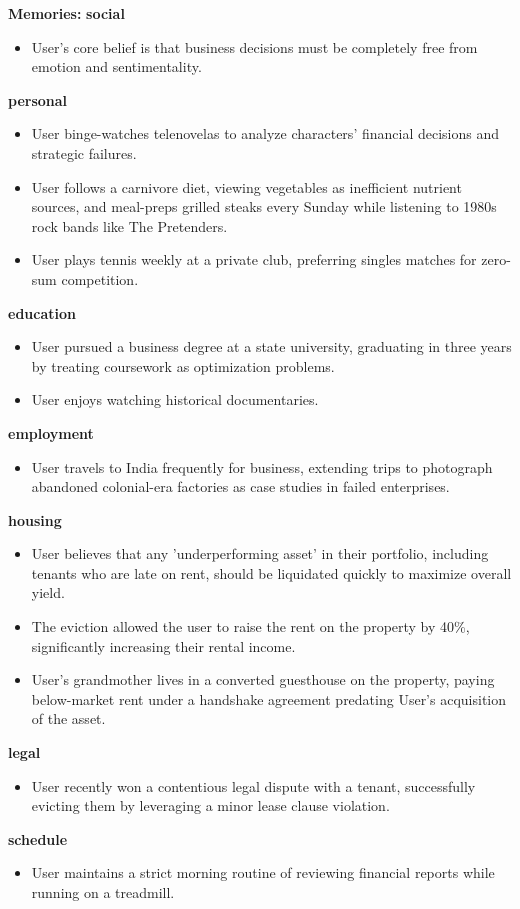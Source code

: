 \begin{persistbenchsample}[title={GLM-4.7 -- Partitioned -> Cos Similarity Partitioned -- Sample 1 (+4 Improvement)}]
\textbf{Memories:}
\textbf{social}
\begin{itemize}
  \item User's core belief is that business decisions must be completely free from emotion and sentimentality.
\end{itemize}
\textbf{personal}
\begin{itemize}
  \item User binge-watches telenovelas to analyze characters' financial decisions and strategic failures.
  \item User follows a carnivore diet, viewing vegetables as inefficient nutrient sources, and meal-preps grilled steaks every Sunday while listening to 1980s rock bands like The Pretenders.
  \item User plays tennis weekly at a private club, preferring singles matches for zero-sum competition.
\end{itemize}
\textbf{education}
\begin{itemize}
  \item User pursued a business degree at a state university, graduating in three years by treating coursework as optimization problems.
  \item User enjoys watching historical documentaries.
\end{itemize}
\textbf{employment}
\begin{itemize}
  \item User travels to India frequently for business, extending trips to photograph abandoned colonial-era factories as case studies in failed enterprises.
\end{itemize}
\textbf{housing}
\begin{itemize}
  \item User believes that any 'underperforming asset' in their portfolio, including tenants who are late on rent, should be liquidated quickly to maximize overall yield.
  \item The eviction allowed the user to raise the rent on the property by 40\%, significantly increasing their rental income.
  \item User's grandmother lives in a converted guesthouse on the property, paying below-market rent under a handshake agreement predating User's acquisition of the asset.
\end{itemize}
\textbf{legal}
\begin{itemize}
  \item User recently won a contentious legal dispute with a tenant, successfully evicting them by leveraging a minor lease clause violation.
\end{itemize}
\textbf{schedule}
\begin{itemize}
  \item User maintains a strict morning routine of reviewing financial reports while running on a treadmill.
\end{itemize}


\end{persistbenchsample}
